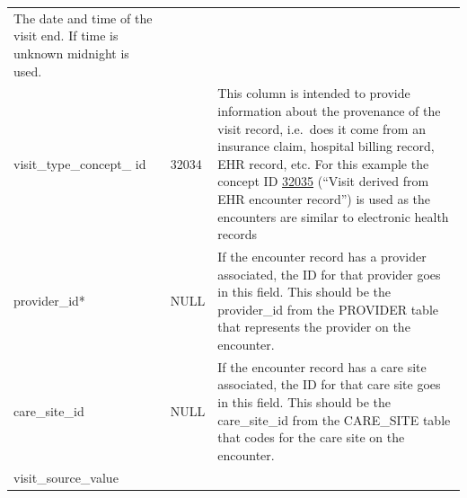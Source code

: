 \documentclass[11pt]{book}
\begin{document}
\begin{longtable}[]{@{}lll@{}}
\begin{minipage}[t]{0.48\columnwidth}
The date and time of the visit end. If time is unknown midnight is
used.\strut
\end{minipage}\tabularnewline
\begin{minipage}[t]{0.28\columnwidth}\raggedright\strut
visit\_type\_concept\_ id\strut
\end{minipage} & \begin{minipage}[t]{0.16\columnwidth}\raggedright\strut
32034\strut
\end{minipage} & \begin{minipage}[t]{0.48\columnwidth}\raggedright\strut
This column is intended to provide information about the provenance of
the visit record, i.e.~does it come from an insurance claim, hospital
billing record, EHR record, etc. For this example the concept ID
\href{http://athena.ohdsi.org/search-terms/terms/32035}{32035} (``Visit
derived from EHR encounter record'') is used as the encounters are
similar to electronic health records\strut
\end{minipage}\tabularnewline
\begin{minipage}[t]{0.28\columnwidth}\raggedright\strut
provider\_id*\strut
\end{minipage} & \begin{minipage}[t]{0.16\columnwidth}\raggedright\strut
NULL\strut
\end{minipage} & \begin{minipage}[t]{0.48\columnwidth}\raggedright\strut
If the encounter record has a provider associated, the ID for that
provider goes in this field. This should be the provider\_id from the
PROVIDER table that represents the provider on the encounter.\strut
\end{minipage}\tabularnewline
\begin{minipage}[t]{0.28\columnwidth}\raggedright\strut
care\_site\_id\strut
\end{minipage} & \begin{minipage}[t]{0.16\columnwidth}\raggedright\strut
NULL\strut
\end{minipage} & \begin{minipage}[t]{0.48\columnwidth}\raggedright\strut
If the encounter record has a care site associated, the ID for that care
site goes in this field. This should be the care\_site\_id from the
CARE\_SITE table that codes for the care site on the encounter.\strut
\end{minipage}\tabularnewline
\begin{minipage}[t]{0.28\columnwidth}\raggedright\strut
visit\_source\_value\strut
\end{minipage} & \begin{minipage}[t]{0.16\columnwidth}\raggedright\strut

\end{minipage}
\end{longtable}
\end{document}
